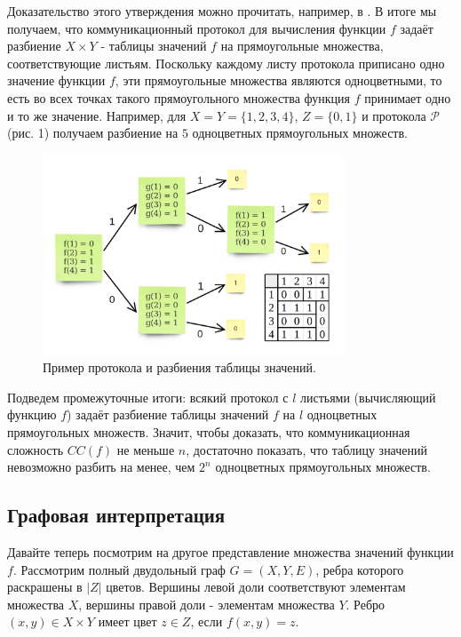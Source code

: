 \documentclass[a4paper]{article}
\begin{document}
Доказательство этого утверждения можно прочитать, например, в \cite{KushilevitzNisan}. В итоге мы получаем,
что коммуникационный протокол для вычисления функции $f$ задаёт разбиение $X\times Y$ - 
таблицы значений $f$ на прямоугольные множества, соответствующие листьям. Поскольку каждому
листу протокола приписано одно значение функции $f$, эти прямоугольные множества являются одноцветными,
то есть во всех точках такого прямоугольного множества функция $f$ принимает одно и то же значение.
Например, для $X = Y = \{1, 2, 3, 4\}$, $Z = \{0, 1\}$ и протокола $\mathcal{P}$ (рис. 1) получаем 
разбиение на $5$ одноцветных прямоугольных множеств. 

\begin{figure}
	\centering
	\includegraphics[width=0.8\textwidth]{images/protocol.png}
	\caption{Пример протокола и разбиения таблицы значений.}
\end{figure}

Подведем промежуточные итоги: всякий протокол с $l$ листьями (вычисляющий функцию $f$) задаёт разбиение
таблицы значений $f$ на $l$ одноцветных прямоугольных множеств. Значит, чтобы доказать, что коммуникационная 
сложность $CC(f)$ не меньше $n$, достаточно показать, что таблицу значений невозможно разбить на менее,
чем $2^n$ одноцветных прямоугольных множеств.

\subsection{Графовая интерпретация}

Давайте теперь посмотрим на другое представление множества значений функции $f$. Рассмотрим полный 
двудольный граф $G = (X, Y, E)$, ребра которого раскрашены в $|Z|$ цветов. Вершины левой доли 
соответствуют элементам множества $X$, вершины правой доли - элементам множества $Y$. Ребро 
$(x, y) \in X\times Y$ имеет цвет $z \in Z$, если $f(x, y) = z$.
\end{document}
